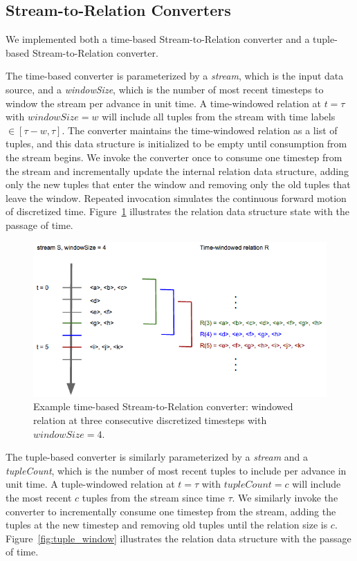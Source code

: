\documentclass[a4paper, 10pt, conference]{IEEEconf}
\begin{document}
\subsection{Stream-to-Relation Converters}
We implemented both a time-based Stream-to-Relation converter and a tuple-based Stream-to-Relation converter. 

The time-based converter is parameterized by a \textit{stream}, which is the input data source, and a \textit{windowSize}, which is the number of most recent timesteps to window the stream per advance in unit time. A time-windowed relation at $t = \tau$ with $windowSize = w$ will include all tuples from the stream with time labels $\in [\tau - w, \tau]$. The converter maintains the time-windowed relation as a list of tuples, and this data structure is initialized to be empty until consumption from the stream begins. We invoke the converter once to consume one timestep from the stream and incrementally update the internal relation data structure, adding only the new tuples that enter the window and removing only the old tuples that leave the window. Repeated invocation simulates the continuous forward motion of discretized time. Figure~\ref{fig:time_window} illustrates the relation data structure state with the passage of time. 

\begin{figure}[tpH]
    \centering
    \centerline{\includegraphics[totalheight=4cm]{time_window.png}}
    \caption{Example time-based Stream-to-Relation converter: windowed relation at three consecutive discretized timesteps with $windowSize = 4$.}
    \label{fig:time_window}
\end{figure}

The tuple-based converter is similarly parameterized by a \textit{stream} and a \textit{tupleCount}, which is the number of most recent tuples to include per advance in unit time. A tuple-windowed relation at $t = \tau$ with $tupleCount = c$ will include the most recent $c$ tuples from the stream since time $\tau$. We similarly invoke the converter to incrementally consume one timestep from the stream, adding the tuples at the new timestep and removing old tuples until the relation size is $c$. Figure~\ref{fig:tuple_window} illustrates the relation data structure with the passage of time. 
\end{document}

